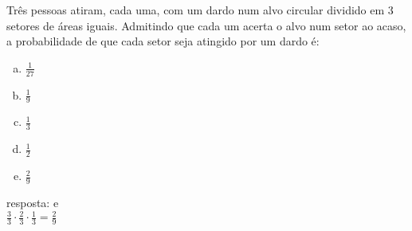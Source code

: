 \begin{ex}
 Três pessoas atiram, cada uma,  com um dardo num alvo circular dividido em 3 setores de áreas iguais. Admitindo que cada um acerta o alvo num setor ao acaso, a probabilidade de que cada setor seja atingido por um dardo é:
    \begin{enumerate}[(a)]
    \item $\frac{1}{27}$
    \item $\frac{1}{9}$
    \item $\frac{1}{3}$
    \item $\frac{1}{2}$
    \item $\frac{2}{9}$
    \end{enumerate}
      \begin{sol}
        resposta: e \\
        $\frac{3}{3}\cdot\frac{2}{3}\cdot\frac{1}{3}=\frac{2}{9}$
      \end{sol}
\end{ex}